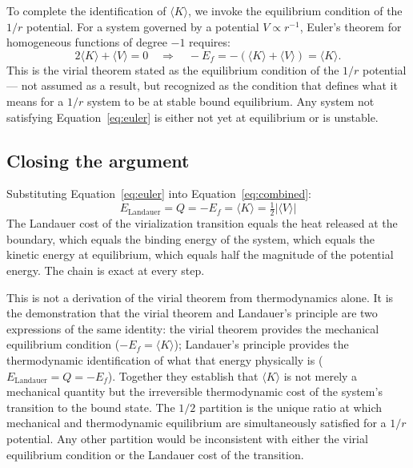 \documentclass[12pt,a4paper]{article}
\begin{document}
To complete the identification of $\langle K \rangle$, we invoke the
equilibrium condition of the $1/r$ potential. For a system governed by a
potential $V \propto r^{-1}$, Euler's theorem for homogeneous functions
of degree $-1$ requires:
\begin{equation}
2\langle K \rangle + \langle V \rangle = 0 \quad \Longrightarrow \quad
-E_f = -(\langle K \rangle + \langle V \rangle) = \langle K \rangle.
\label{eq:euler}
\end{equation}
This is the virial theorem stated as the equilibrium condition of the
$1/r$ potential --- not assumed as a result, but recognized as the
condition that defines what it means for a $1/r$ system to be at stable
bound equilibrium. Any system not satisfying Equation~\ref{eq:euler} is
either not yet at equilibrium or is unstable.

\subsection{Closing the argument}

Substituting Equation~\ref{eq:euler} into Equation~\ref{eq:combined}:
\begin{equation}
\boxed{E_\mathrm{Landauer} = Q = -E_f = \langle K \rangle = \tfrac{1}{2}|\langle V \rangle|}
\label{eq:identity}
\end{equation}
The Landauer cost of the virialization transition equals the heat released
at the boundary, which equals the binding energy of the system, which
equals the kinetic energy at equilibrium, which equals half the magnitude
of the potential energy. The chain is exact at every step.

This is not a derivation of the virial theorem from thermodynamics alone.
It is the demonstration that the virial theorem and Landauer's principle
are two expressions of the same identity: the virial theorem provides the
mechanical equilibrium condition ($-E_f = \langle K \rangle$); Landauer's
principle provides the thermodynamic identification of what that energy
physically is ($E_\mathrm{Landauer} = Q = -E_f$). Together they establish
that $\langle K \rangle$ is not merely a mechanical quantity but the
irreversible thermodynamic cost of the system's transition to the bound
state. The $1/2$ partition is the unique ratio at which mechanical and
thermodynamic equilibrium are simultaneously satisfied for a $1/r$
potential. Any other partition would be inconsistent with either the
virial equilibrium condition or the Landauer cost of the transition.
\end{document}
